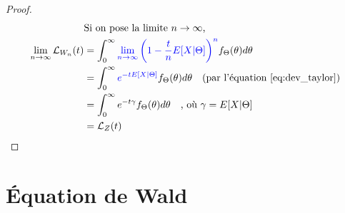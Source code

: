 \begin{proof}
\begin{align*}
	& \text{Si on pose la limite $n \to \infty$,} \\
\lim_{n \to \infty} \mathcal{L}_{W_n}(t)	& = \int_{0}^{\infty} \textcolor{blue}{\lim_{n \to \infty} \left(1 - \frac{t}{n} E[X|\Theta] \right)^n} f_\Theta (\theta) d \theta \\
	& = \int_{0}^{\infty} \textcolor{blue}{e^{-t E[X|\Theta]}} f_\Theta (\theta) d \theta \quad \text{(par l'équation \eqref{eq:dev_taylor})} \\
	& = \int_{0}^{\infty} e^{-t \gamma} f_\Theta (\theta) d \theta \quad \text{, où } \gamma = E[X|\Theta] \\
	& = \mathcal{L}_Z(t) \\ 
\end{align*}
\end{proof}

\section{Équation de Wald}
\label{preuve:wald_eqn}


